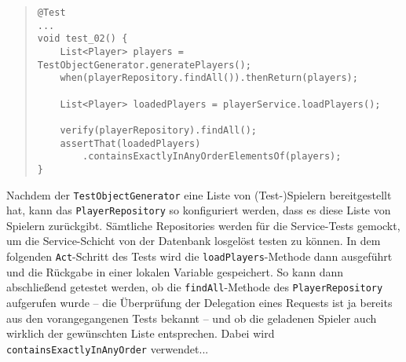 \begin{quote}
\begin{verbatim}
@Test
...
void test_02() {
    List<Player> players = TestObjectGenerator.generatePlayers();
    when(playerRepository.findAll()).thenReturn(players);

    List<Player> loadedPlayers = playerService.loadPlayers();

    verify(playerRepository).findAll();
    assertThat(loadedPlayers)
        .containsExactlyInAnyOrderElementsOf(players);
}
\end{verbatim}
\end{quote}

Nachdem der \texttt{TestObjectGenerator} eine Liste von (Test-)Spielern 
bereitgestellt hat, kann das \texttt{PlayerRepository} so konfiguriert werden, dass 
es diese Liste von Spielern zurückgibt. Sämtliche Repositories werden für die 
Service-Tests gemockt, um die Service-Schicht von der Datenbank losgelöst testen zu 
können. In dem folgenden \texttt{Act}-Schritt des Tests wird die 
\texttt{loadPlayers}-Methode dann ausgeführt und die Rückgabe in einer lokalen 
Variable gespeichert. So kann dann abschließend getestet werden, ob die 
\texttt{findAll}-Methode des \texttt{PlayerRepository} aufgerufen wurde -- die 
Überprüfung der Delegation eines Requests ist ja bereits aus den vorangegangenen 
Tests bekannt -- und ob die geladenen Spieler auch wirklich der gewünschten Liste 
entsprechen. Dabei wird \texttt{containsExactlyInAnyOrder} verwendet... 

